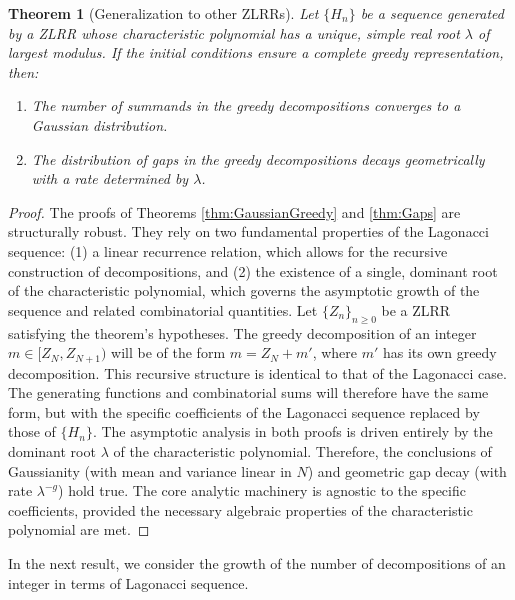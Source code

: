 \documentclass[11pt]{amsart}
\theoremstyle{plain}
\numberwithin{equation}{section} %
\newtheorem{theorem}[thm]{Theorem}
\numberwithin{table}{section} %
\numberwithin{figure}{section}
\begin{document}
	
	
	\begin{theorem}[Generalization to other ZLRRs] \label{conj:general_zlrr}
		Let $\{H_n\}$ be a sequence generated by a ZLRR whose characteristic polynomial has a unique, simple real root $\lambda$ of largest modulus. If the initial conditions ensure a complete greedy representation, then:
		\begin{enumerate}
			\item The number of summands in the greedy decompositions converges to a Gaussian distribution.
			\item The distribution of gaps in the greedy decompositions decays geometrically with a rate determined by $\lambda$.
		\end{enumerate}
	\end{theorem}
	\begin{proof}
		The proofs of Theorems
		\ref{thm:GaussianGreedy} and \ref{thm:Gaps} are structurally robust. They rely on two fundamental properties of the Lagonacci sequence: (1) a linear recurrence relation, which allows for the recursive construction of decompositions, and (2) the existence of a single, dominant root of the characteristic polynomial, which governs the asymptotic growth of the sequence and related combinatorial quantities.
		Let $\{Z_n\}_{n\ge0}$ be a ZLRR satisfying the theorem's hypotheses. The greedy decomposition of an integer $m \in [Z_N, Z_{N+1})$ will be of the form $m = Z_N + m'$, where $m'$ has its own greedy decomposition. This recursive structure is identical to that of the Lagonacci case. The generating functions and combinatorial sums will therefore have the same form, but with the specific coefficients of the Lagonacci sequence replaced by those of $\{H_n\}$. The asymptotic analysis in both proofs is driven entirely by the dominant root $\lambda$ of the characteristic polynomial. Therefore, the conclusions of Gaussianity (with mean and variance linear in $N$) and geometric gap decay (with rate $\lambda^{-g}$) hold true. The core analytic machinery is agnostic to the specific coefficients, provided the necessary algebraic properties of the characteristic polynomial are met.
	\end{proof}
	
	In the next result, we consider the growth of the number of decompositions of an integer in terms of Lagonacci sequence.
	
\end{document}
